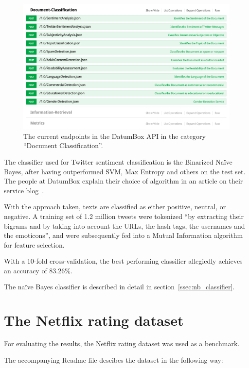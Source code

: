 \begin{figure}[h]
  \centering
    \includegraphics[width=\textwidth]{Figures/datumbox_api}
  \caption{The current endpoints in the DatumBox API in the category ``Document Classification''.}
  \label{fig:datumbox_api}
\end{figure}

The classifier used for Twitter sentiment classification is the Binarized Naïve Bayes, after having outperformed SVM, Max Entropy and others on the test set. The people at DatumBox explain their choice of algorithm in an article on their service blog~\cite{DatumBoxTwitterSentiment}.

With the approach taken, texts are classified as either positive, neutral, or negative.
A training set of 1.2 million tweets were tokenized ``by extracting their bigrams and by taking into account the URLs, the hash tags, the usernames and the emoticons'', and were subsequently fed into a Mutual Information algorithm for feature selection.

With a 10-fold cross-validation, the best performing classifier allegiedly achieves an accuracy of 83.26\%.

The naïve Bayes classifier is described in detail in section~\ref{ssec:nb_classifier}.

\section{The Netflix rating dataset}
\label{sec:netflix_dataset}

For evaluating the results, the Netflix rating dataset was used as a benchmark.

The accompanying Readme file descibes the dataset in the following way:

